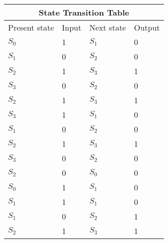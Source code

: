 

\begin{tabular}{ |p{1cm}|p{1cm}|p{1cm}|p{1cm}| }
\hline
\multicolumn{4}{|c|}{State Transition Table} \\
\hline
Present state & Input & Next state & Output  \\
\hline
 $S_0$ & 1 & $S_1$ &0 \\
\hline
$S_1$ & 0 & $S_2$  &0\\
\hline
$S_2$ & 1 & $S_3$  &1\\
\hline
$S_3$ & 0 & $S_2$  &0\\
\hline
$S_2$ & 1 & $S_3$  &1\\
\hline
$S_3$ & 1 & $S_1$  &0\\
\hline
$S_1$ & 0 & $S_2$  &0\\
\hline
$S_2$ & 1 & $S_3$  &1\\
\hline
$S_3$ & 0 & $S_2$  &0\\
\hline
$S_2$ & 0 & $S_0$  &0\\
\hline
$S_0$ & 1 & $S_1$  &0\\
\hline
$S_1$ & 1 & $S_1$  &0\\
\hline
$S_1$ & 0 & $S_2$  &1\\
\hline
$S_2$ & 1 & $S_3$  &1\\
\hline

\end{tabular}
